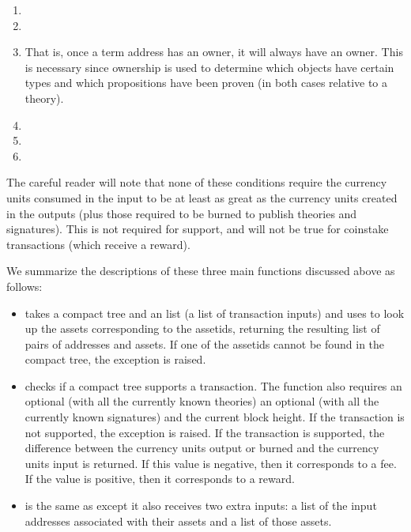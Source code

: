 \begin{enumerate}
\item {}

\item {}


\item {}
That is, once a term address has an owner, it will always have an owner.
This is necessary since ownership is used to determine which objects have certain types and which propositions
have been proven (in both cases relative to a theory).
\item {}
\item {}

\item {}

\end{enumerate}
The careful reader will note that none of these conditions require the currency units consumed
in the input to be at least as great as the currency units created in the outputs (plus those
required to be burned to publish theories and signatures).
This is not required for support,
and will not be true for coinstake transactions (which receive a reward).

We summarize the descriptions of these three main functions discussed above as follows:
\begin{itemize}
\item {} takes a compact tree and an
{} list (a list of transaction inputs)
and uses {} to look up the assets corresponding to
the assetids, returning the resulting list of pairs of addresses and assets.
If one of the assetids cannot be found in the compact tree,
the exception {} is raised.
\item {} checks if a compact tree supports a transaction.
The function also requires an optional {} (with all the currently known theories)
an optional {} (with all the currently known signatures)
and the current block height.
If the transaction is not supported, the exception {} is raised.
If the transaction is supported,
the difference between the currency units output or burned and the currency units input
is returned. If this value is negative, then it corresponds to a fee.
If the value is positive, then it corresponds to a reward.
\item {} is the same as {}
except it also receives two extra inputs:
a list of the input addresses associated with their assets
and a list of those assets.
\end{itemize}

